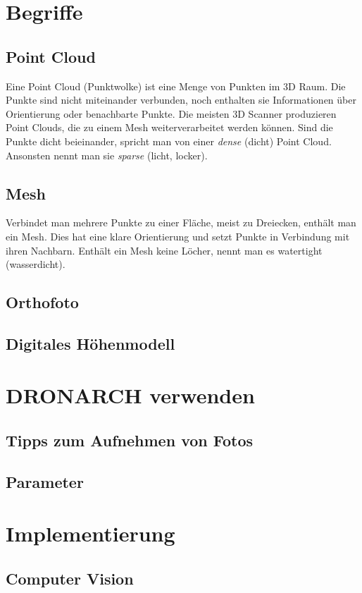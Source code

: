 \chapter{Begriffe}
		\section{Point Cloud}\label{app:point_cloud}
		Eine Point Cloud (Punktwolke) ist eine Menge von Punkten im 3D Raum. Die Punkte sind nicht miteinander verbunden, noch enthalten sie Informationen über Orientierung oder benachbarte Punkte. Die meisten 3D Scanner produzieren Point Clouds, die zu einem Mesh weiterverarbeitet werden können.
		Sind die Punkte dicht beieinander, spricht man von einer \emph{dense} (dicht) Point Cloud. Ansonsten nennt man sie \emph{sparse} (licht, locker).
		
		\section{Mesh}\label{app:mesh}
		Verbindet man mehrere Punkte zu einer Fläche, meist zu Dreiecken, enthält man ein Mesh. Dies hat eine klare Orientierung und setzt Punkte in Verbindung mit ihren Nachbarn. Enthält ein Mesh keine Löcher, nennt man es watertight (wasserdicht).
		
		\section{Orthofoto} \label{app:orthofoto}
		
		\section{Digitales Höhenmodell} \label{app:dtm}

\chapter{DRONARCH verwenden}
	\section{Tipps zum Aufnehmen von Fotos}\label{app:tip_foto}
	\section{Parameter}\label{app:param}
	
\chapter{Implementierung} \label{app:imp}
	\section{Computer Vision} \label{app:imp:comp_vis}